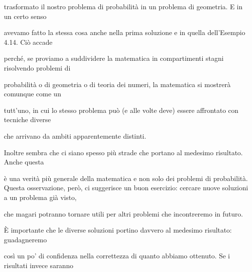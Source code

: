 \documentclass[a4paper,portrait,12pt]{article}
\begin{document}
\begin{flushleft}
trasformato il nostro problema di probabilit\`{a} in un problema di geometria. E in un certo senso
\end{flushleft}


\begin{flushleft}
avevamo fatto la stessa cosa anche nella prima soluzione e in quella dell'Esempio 4.14. Ci\`{o} accade
\end{flushleft}


\begin{flushleft}
perch\'{e}, se proviamo a suddividere la matematica in compartimenti stagni risolvendo problemi di
\end{flushleft}


\begin{flushleft}
probabilit\`{a} o di geometria o di teoria dei numeri, la matematica si mostrer\`{a} comunque come un
\end{flushleft}


\begin{flushleft}
tutt'uno, in cui lo stesso problema pu\`{o} (e alle volte deve) essere affrontato con tecniche diverse
\end{flushleft}


\begin{flushleft}
che arrivano da ambiti apparentemente distinti.
\end{flushleft}


\begin{flushleft}
Inoltre sembra che ci siano spesso più strade che portano al medesimo risultato. Anche questa
\end{flushleft}


\begin{flushleft}
\`{e} una verit\`{a} più generale della matematica e non solo dei problemi di probabilit\`{a}. Questa osservazione, per\`{o}, ci suggerisce un buon esercizio: cercare nuove soluzioni a un problema gi\`{a} visto,
\end{flushleft}


\begin{flushleft}
che magari potranno tornare utili per altri problemi che incontreremo in futuro.
\end{flushleft}


\begin{flushleft}
\`{E} importante che le diverse soluzioni portino davvero al medesimo risultato: guadagneremo
\end{flushleft}


\begin{flushleft}
così un po' di confidenza nella correttezza di quanto abbiamo ottenuto. Se i risultati invece saranno
\end{flushleft}
\end{document}

